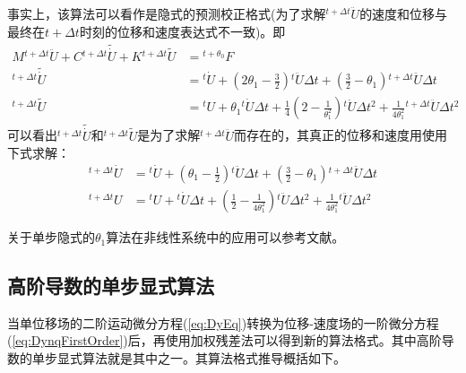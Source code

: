 事实上，该算法可以看作是隐式的预测校正格式(为了求解${^{t+\Delta t}\!\ddot{U}}$的速度和位移与最终在$t+\Delta t$时刻的位移和速度表达式不一致)。即
\begin{subequations}
\begin{align}
M{^{t+\Delta t}\!\ddot{U}}+C{^{t+\Delta t}\!\widetilde{\dot{U}}}+K{^{t+\Delta t}\!\widetilde{{U}}}&={^{t+\theta_0}\!F}\\
{^{t+\Delta t}\!\widetilde{\dot{U}}}&={^t\!\dot{U}}+(2\theta_1-\frac{3}{2}){^t\!\ddot{U}}\Delta t+(\frac{3}{2}-\theta_1){^{t+\Delta t}\!\ddot{U}}\Delta t\\
{^{t+\Delta t}\!\widetilde{{U}}}&={^t\!U}+\theta_1{^t\!\dot{U}}\Delta t+\frac{1}{4}(2-\frac{1}{\theta_1^2}){^t\!\ddot{U}}\Delta t^2+\frac{1}{4\theta_1^2}{^{t+\Delta t}\!\ddot{U}}\Delta t^2
\end{align}
\end{subequations}
可以看出${^{t+\Delta t}\!\widetilde{\dot{U}}}$和${^{t+\Delta t}\!\widetilde{{U}}}$是为了求解${^{t+\Delta t}\!\ddot{U}}$而存在的，其真正的位移和速度用使用下式求解：
\begin{subequations}
\begin{align}
{^{t+\Delta t}\!\dot{U}}&={^t\!\dot{U}}+(\theta_1-\frac{1}{2}){^t\!\ddot{U}}\Delta t+(\frac{3}{2}-\theta_1){^{t+\Delta t}\!\ddot{U}}\Delta t\\
{^{t+\Delta t}\!U}&={^t\!U}+{^t\!\dot{U}}\Delta t+(\frac12-\frac{1}{4\theta_1^2}){^t\!\ddot{U}}\Delta t^2+\frac{1}{4\theta_1^2}{^t\!\ddot{U}}\Delta t^2
\end{align}
\end{subequations}

关于单步隐式的$\theta_1$算法在非线性系统中的应用可以参考文献。

\subsection{高阶导数的单步显式算法}
当单位移场的二阶运动微分方程(\ref{eq:DyEq})转换为位移-速度场的一阶微分方程(\ref{eq:DynqFirstOrder})后，再使用加权残差法可以得到新的算法格式。其中高阶导数的单步显式算法\cite{Hoff1990,Hoff1990a}就是其中之一。其算法格式推导概括如下。

